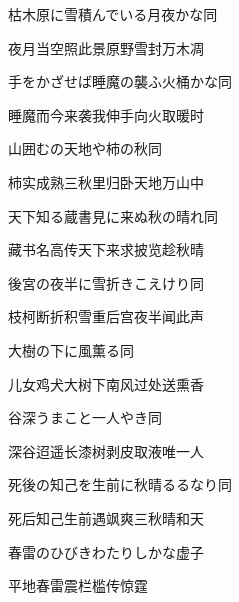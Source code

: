 \begin{haiku}
    {\FH 枯木原に雪積んでいる月夜かな}\hfill{\FH 同}

    {\FK 夜月当空照此景原野雪封万木凋}
\end{haiku}

\begin{haiku}
    {\FH 手をかざせば睡魔の襲ふ火桶かな}\hfill{\FH 同}

    {\FK 睡魔而今来袭我伸手向火取暖时}
\end{haiku}

\begin{haiku}
    {\FH 山囲むの天地や柿の秋}\hfill{\FH 同}

    {\FK 柿实成熟三秋里归卧天地万山中}
\end{haiku}

\begin{haiku}
    {\FH 天下知る蔵書見に来ぬ秋の晴れ}\hfill{\FH 同}

    {\FK 藏书名高传天下来求披览趁秋晴}
\end{haiku}

\begin{haiku}
    {\FH 後宮の夜半に雪折きこえけり}\hfill{\FH 同}

    {\FK 枝柯断折积雪重后宫夜半闻此声}
\end{haiku}

\begin{haiku}
    {\FH 大樹の下に風薫る}\hfill{\FH 同}

    {\FK 儿女鸡犬大树下南风过处送熏香}
\end{haiku}

\begin{haiku}
    {\FH 谷深うまこと一人やき}\hfill{\FH 同}

    {\FK 深谷迢遥长漆树剥皮取液唯一人}
\end{haiku}

\begin{haiku}
    {\FH 死後の知己を生前に秋晴るるなり}\hfill{\FH 同}

    {\FK 死后知己生前遇飒爽三秋晴和天}
\end{haiku}

\begin{haiku}
    {\FH 春雷のひびきわたりしかな}\hfill{\FH 虚子}

    {\FK 平地春雷震栏槛传惊霆}
\end{haiku}

